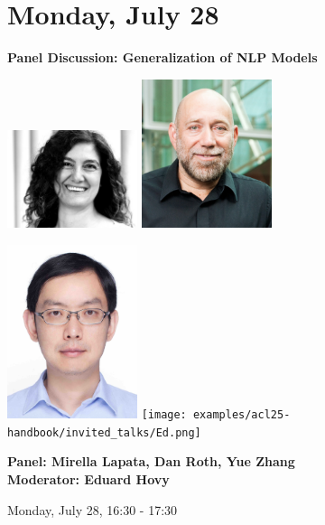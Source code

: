 \section{Monday, July 28}
\vspace*{0.2cm}

\begin{center}
    {\Large \textbf{Panel Discussion: Generalization of NLP Models}}
    
    \includegraphics[width=1.5in]{examples/acl25-handbook/invited_talks/Mirella.jpg}
    \includegraphics[width=1.5in]{examples/acl25-handbook/invited_talks/dan.jpg}

    \includegraphics[width=1.5in]{examples/acl25-handbook/invited_talks/Yue.jpg}
    \texttt{[image: examples/acl25-handbook/invited\_talks/Ed.png]}
    
    {\large \textbf{Panel: Mirella Lapata, Dan Roth, Yue Zhang}}\\
    {\large \textbf{Moderator: Eduard Hovy}}

    Monday, July 28, 16:30 - 17:30
\end{center}

